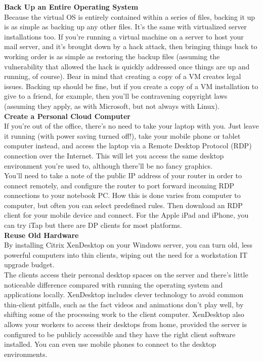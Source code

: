 \documentclass[a4paper,12pt]{report}
\begin{document}
\newline
\textbf{ Back Up an Entire Operating System}\\
Because the virtual OS is entirely contained within a series of files, backing it up is as simple as backing up any other files. It's the same with virtualized server installations too. If you're running a virtual machine on a server to host your mail server, and it's brought down by a hack attack, then bringing things back to working order is as simple as restoring the backup files (assuming the vulnerability that allowed the hack is quickly addressed once things are up and running, of course).
Bear in mind that creating a copy of a VM creates legal issues. Backing up should be fine, but if you create a copy of a VM installation to give to a friend, for example, then you'll be contravening copyright laws (assuming they apply, as with Microsoft, but not always with Linux).\\
\newline
\textbf{ Create a Personal Cloud Computer}\\
If you're out of the office, there's no need to take your laptop with you. Just leave it running (with power saving turned off!), take your mobile phone or tablet computer instead, and access the laptop via a Remote Desktop Protocol (RDP) connection over the Internet. This will let you access the same desktop environment you're used to, although there'll be no fancy graphics.\\
\newline
You'll need to take a note of the public IP address of your router in order to connect remotely, and configure the router to port forward incoming RDP connections to your notebook PC. How this is done varies from computer to computer, but often you can select predefined rules.
Then download an RDP client for your mobile device and connect. For the Apple iPad and iPhone, you can try iTap but there are DP clients for most platforms.\\
\newline
\textbf{Reuse Old Hardware}\\
By installing Citrix XenDesktop on your Windows server, you can turn old, less powerful computers into thin clients, wiping out the need for a workstation IT upgrade budget.\\
\newline
The clients access their personal desktop spaces on the server and there's little noticeable difference compared with running the operating system and applications locally. XenDesktop includes clever technology to avoid common thin-client pitfalls, such as the fact videos and animations don't play well, by shifting some of the processing work to the client computer.
XenDesktop also allows your workers to access their desktops from home, provided the server is configured to be publicly accessible and they have the right client software installed. You can even use mobile phones to connect to the desktop environments.
\end{document}
